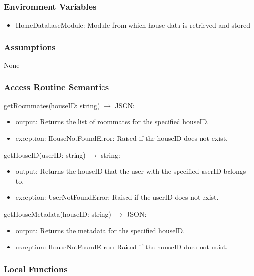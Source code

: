 \documentclass[12pt, titlepage]{article}
\begin{document}
\subsubsection{Environment Variables}

\begin{itemize}
  \item HomeDatabaseModule: Module from which house data is retrieved and stored
\end{itemize}

\subsubsection{Assumptions}
None

\subsubsection{Access Routine Semantics}

\noindent getRoommates(houseID: string) $\rightarrow$ JSON:
\begin{itemize}
\item output: Returns the list of roommates for the specified houseID.
\item exception: HouseNotFoundError: Raised if the houseID does not exist.
\end{itemize}

\noindent getHouseID(userID: string) $\rightarrow$ string:
\begin{itemize}
\item output: Returns the houseID that the user with the specified userID belongs to.
\item exception: UserNotFoundError: Raised if the userID does not exist.
\end{itemize}

\noindent getHouseMetadata(houseID: string) $\rightarrow$ JSON:
\begin{itemize}
\item output: Returns the metadata for the specified houseID.
\item exception: HouseNotFoundError: Raised if the houseID does not exist.
\end{itemize}

\subsubsection{Local Functions}
\end{document}
